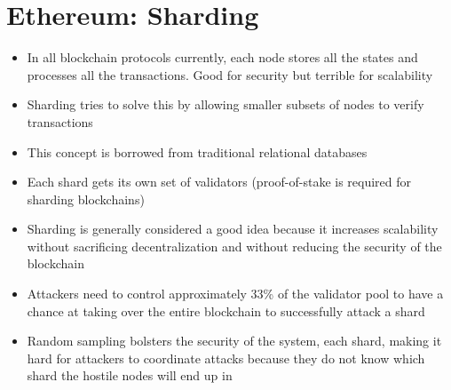 \section{Ethereum: Sharding}
\begin{itemize}
	\item In all blockchain protocols currently, each node stores all the states and processes all the transactions. Good for security but terrible for scalability
	\item Sharding tries to solve this by allowing smaller subsets of nodes to verify transactions
	\item This concept is borrowed from traditional relational databases
	\item Each shard gets its own set of validators (proof-of-stake is required for sharding blockchains)
	\item Sharding is generally considered a good idea because it increases scalability without sacrificing decentralization and without reducing the security of the blockchain
	\item Attackers need to control approximately 33\% of the validator pool to have a chance at taking over the entire blockchain to successfully attack a shard
	\item Random sampling bolsters the security of the system, each shard, making it hard for attackers to coordinate attacks because they do not know which shard the hostile nodes will end up in
\end{itemize}